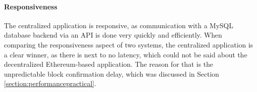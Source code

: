 \paragraph{Responsiveness}
The centralized application is responsive, as communication with a MySQL database backend via an API is done very quickly and efficiently. When comparing the responsiveness aspect of two systems, the centralized application is a clear winner, as there is next to no latency, which could not be said about the decentralized Ethereum-based application. The reason for that is the unpredictable block confirmation delay, which was discussed in Section \ref{section:performancepractical}.